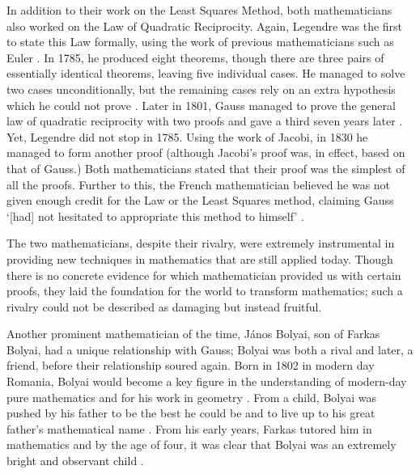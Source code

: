 \documentclass{article}
\begin{document}
In addition to their work on the Least Squares Method, both mathematicians also worked on the Law of Quadratic Reciprocity. Again, Legendre was the first to state this Law formally, using the work of previous mathematicians such as Euler \cite{weintraub}. In 1785, he produced eight theorems, though there are three pairs of essentially identical theorems, leaving five individual cases. He managed to solve two cases unconditionally, but the remaining cases rely on an extra hypothesis which he could not prove \cite{weintraub}. Later in 1801, Gauss managed to prove the general law of quadratic reciprocity with two proofs and gave a third seven years later \cite{weintraub}. Yet, Legendre did not stop in 1785. Using the work of Jacobi, in 1830 he managed to form another proof (although Jacobi’s proof was, in effect, based on that of Gauss.) Both mathematicians stated that their proof was the simplest of all the proofs. Further to this, the French mathematician believed he was not given enough credit for the Law or the Least Squares method, claiming Gauss ‘[had] not hesitated to appropriate this method to himself’ \cite{standrewsbolyai}. 

The two mathematicians, despite their rivalry, were extremely instrumental in providing new techniques in mathematics that are still applied today. Though there is no concrete evidence for which mathematician provided us with certain proofs, they laid the foundation for the world to transform mathematics; such a rivalry could not be described as damaging but instead fruitful. 

Another prominent mathematician of the time, János Bolyai, son of Farkas Bolyai, had a unique relationship with Gauss; Bolyai was both a rival and later, a friend, before their relationship soured again. Born in 1802 in modern day Romania, Bolyai would become a key figure in the understanding of modern-day pure mathematics and for his work in geometry \cite{britannicajanos}. From a child, Bolyai was pushed by his father to be the best he could be and to live up to his great father’s mathematical name \cite{britannicajanos}. From his early years, Farkas tutored him in mathematics and by the age of four, it was clear that Bolyai was an extremely bright and observant child \cite{britannicajanos}. 
\end{document}
